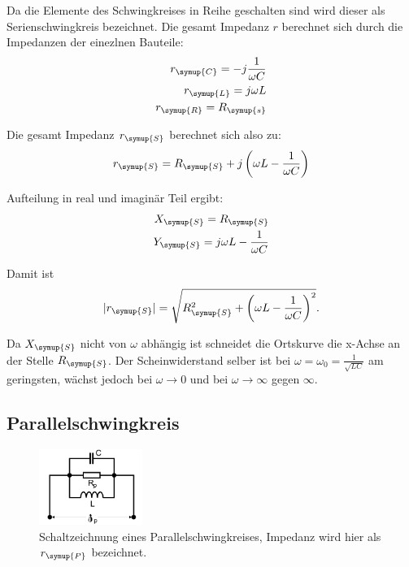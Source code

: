     \noindent Da die Elemente des Schwingkreises in Reihe geschalten sind wird dieser als Serienschwingkreis bezeichnet. Die gesamt Impedanz $r$ berechnet 
    sich durch die Impedanzen der einezlnen Bauteile:
    \begin{align}
        r_{\symup{C}} = -j\frac{1}{\omega C} \nonumber\\
        r_{\symup{L}} = j\omega L  \nonumber\\
        r_{\symup{R}} = R_{\symup{s}} \nonumber
    \end{align}

    \noindent Die gesamt Impedanz $r_{\symup{S}}$ berechnet sich also zu:
    \begin{equation}
        r_{\symup{S}} = R_{\symup{S}} + j \left(    \omega L - \frac{1}{\omega C} \right) \nonumber
    \end{equation}

    \noindent Aufteilung in real und imaginär Teil ergibt:
    \begin{align}
        X_{\symup{S}} = R_{\symup{S}}  \nonumber\\ 
        Y_{\symup{S}} = j \omega L - \frac{1}{\omega C} \nonumber
    \end{align}

    \noindent Damit ist
    \begin{equation}
        |r_{\symup{S}}| = \sqrt{R^2_{\symup{S}} + \left( \omega L - \frac{1}{\omega C} \right)^2} . \nonumber
    \end{equation}

    \noindent Da $X_{\symup{S}}$ nicht von $\omega$ abhängig ist schneidet die Ortskurve die x-Achse an der Stelle $R_{\symup{S}}$. Der Scheinwiderstand 
    selber ist bei $\omega = \omega_0 = \frac{1}{\sqrt{LC}}$ am geringsten, wächst jedoch bei $\omega \to 0$ und bei $\omega \to \infty$ 
    gegen $\infty$.


        \subsection{Parallelschwingkreis}
    
    
        \begin{figure}[H]
            \centering
            \includegraphics[width=0.3\textwidth]{images/Parallelschaltung.PNG}
            \caption{Schaltzeichnung eines Parallelschwingkreises, Impedanz wird hier als $r_{\symup{P}}$ bezeichnet.}
            \label{img:para}
        \end{figure}

